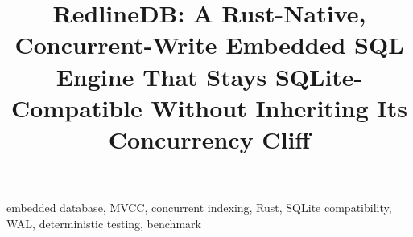 \documentclass[conference]{IEEEtran}
\title{RedlineDB: A Rust-Native, Concurrent-Write Embedded SQL Engine That Stays SQLite-Compatible Without Inheriting Its Concurrency Cliff}
\author{\IEEEauthorblockN{Anonymous Submission}
\IEEEauthorblockA{RedlineDB Authors\\
Email: redlinedb@example.org}}
\begin{document}
\maketitle



\begin{IEEEkeywords}
embedded database, MVCC, concurrent indexing, Rust, SQLite compatibility, WAL, deterministic testing, benchmark
\end{IEEEkeywords}













\end{document}
